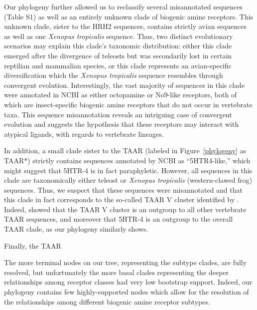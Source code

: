 \documentclass[fleqn,10pt]{wlpeerj}
\begin{document}
Our phylogeny further allowed us to reclassify several misannotated sequences (Table S1) as well as an entirely unknown clade of biogenic amine receptors. This unknown clade, sister to the HRH2 sequences, contains strictly avian sequences as well as one \emph{Xenopus tropicalis} sequence. Thus, two distinct evolutionary scenarios may explain this clade's taxonomic distribution: either this clade emerged after the divergence of teleosts but was secondarily lost in certain reptilian and mammalian species, or this clade represents an avian-specific diversification which the \emph{Xenopus tropicalis} sequence resembles through convergent evolution. Interestingly, the vast majority of sequences in this clade were annotated in NCBI as either octopamine or No9-like receptors, both of which are insect-specific biogenic amine receptors that do not occur in vertebrate taxa. This sequence misannotation reveals an intriguing case of convergent evolution and suggests the hypothesis that these receptors may interact with atypical ligands, with regards to vertebrate lineages. %

In addition, a small clade sister to the TAAR (labeled in Figure~\ref{phylogeny} as TAAR$\ast$) strictly contains sequences annotated by NCBI as ``5HTR4-like,'' which might suggest that 5HTR-4 is in fact paraphyletic. However, all sequences in this clade are taxonomically either teleost or \emph{Xenopus tropicalis} (western-clawed frog) sequences. Thus, we suspect that these sequences were misannotated and that this clade in fact corresponds to the so-called TAAR V cluster identified by \cite{Hashiguchi2007}. Indeed, \cite{Hashiguchi2007} showed that the TAAR V cluster is an outgroup to all other vertebrate TAAR sequences, and moreover that 5HTR-4 is an outgroup to the overall TAAR clade, as our phylogeny similarly shows.

Finally, the TAAR

The more terminal nodes on our tree, representing the subtype clades, are fully resolved, but unfortunately the more basal clades representing the deeper relationships among receptor classes had very low bootstrap support. Indeed, our phylogeny contains few highly-supported nodes which allow for the resolution of the relationships among different biogenic amine receptor subtypes. 
\end{document}
